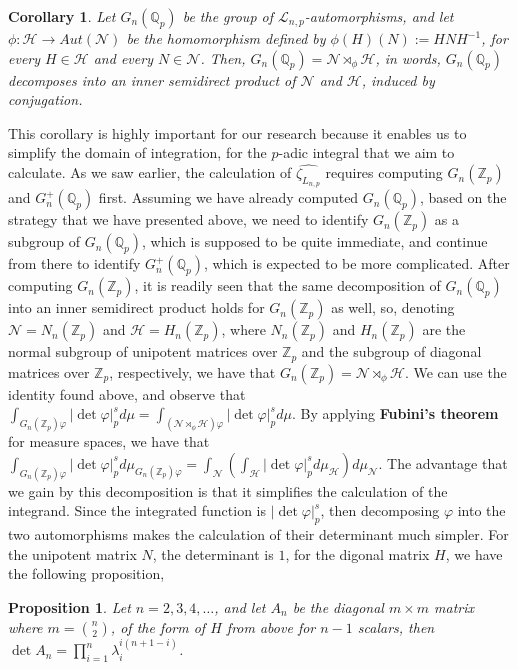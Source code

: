 \documentclass[12pt]{article}
\newtheorem{proposition}[theorem]{Proposition}
\newtheorem{corollary}[theorem]{Corollary}
\begin{document}
\begin{corollary}
Let $G_n(\mathbb{Q}_p)$ be the group of $\mathcal{L}_{n,p}$-automorphisms, and let $\phi:\mathcal{H}\rightarrow Aut(\mathcal{N})$ be the homomorphism defined by $\phi(H)(N):=HNH^{-1}$, for every $H\in \mathcal{H}$ and every $N\in \mathcal{N}$. Then, $G_n(\mathbb{Q}_p)=\mathcal{N}\rtimes_{\phi}\mathcal{H}$, in words, $G_n(\mathbb{Q}_p)$ decomposes into an inner semidirect product of $\mathcal{N}$ and $\mathcal{H}$, induced by conjugation.
\end{corollary}
This corollary is highly important for our research because it enables us to simplify the domain of integration, for the $p$-adic integral that we aim to calculate. As we saw earlier, the calculation of $\hat{\zeta_{L_{n,p}}}$ requires computing $G_n(\mathbb{Z}_p)$ and $G_n^+(\mathbb{Q}_p)$ first. Assuming we have already computed $G_n(\mathbb{Q}_p)$, based on the strategy that we have presented above, we need to identify $G_n(\mathbb{Z}_p)$ as a subgroup of $G_n(\mathbb{Q}_p)$, which is supposed to be quite immediate, and continue from there to identify $G_n^+(\mathbb{Q}_p)$, which is expected to be more complicated. After computing $G_n(\mathbb{Z}_p)$, it is readily seen that the same decomposition of $G_n(\mathbb{Q}_p)$ into an inner semidirect product holds for $G_n(\mathbb{Z}_p)$ as well, so, denoting $\mathcal{N}=N_n(\mathbb{Z}_p)$ and $\mathcal{H}=H_n(\mathbb{Z}_p)$, where $N_n(\mathbb{Z}_p)$ and $H_n(\mathbb{Z}_p)$ are the normal subgroup of unipotent matrices over $\mathbb{Z}_p$ and the subgroup of diagonal matrices over $\mathbb{Z}_p$, respectively, we have that $G_n(\mathbb{Z}_p)=\mathcal{N}\rtimes_{\phi}\mathcal{H}$. We can use the identity found above, and observe that $\displaystyle\int_{G_n(\mathbb{Z}_p)\varphi}|\det\varphi|_p^sd\mu=\displaystyle\int_{(\mathcal{N}\rtimes_{\phi}\mathcal{H})\varphi}|\det\varphi|_p^sd\mu$. By applying \textbf{Fubini's theorem} for measure spaces, we have that $\displaystyle\int_{G_n(\mathbb{Z}_p)\varphi}|\det\varphi|_p^sd\mu_{G_n(\mathbb{Z}_p)\varphi}=\displaystyle\int_{\mathcal{N}}\left(\displaystyle\int_{\mathcal{H}}|\det\varphi|_p^sd\mu_{\mathcal{H}}\right)d\mu_{\mathcal{N}}$.
The advantage that we gain by this decomposition is that it simplifies the calculation of the integrand. Since the integrated function is $|\det\varphi|_p^s$, then decomposing $\varphi$ into the two automorphisms makes the calculation of their determinant much simpler. For the unipotent matrix $N$, the determinant is $1$, for the digonal matrix $H$, we have the following proposition,
\begin{proposition}
\label{prop.h.matrix.determinant}
Let $n=2,3,4,\dots$, and let $A_n$ 
be the diagonal $m\times m$ matrix where $m=\binom{n}{2}$, of the form of $H$ from above for $n-1$ scalars, then $\det A_n=\prod_{i=1}^{n}\lambda_i^{i(n+1-i)}$.
\end{proposition}
\end{document}
